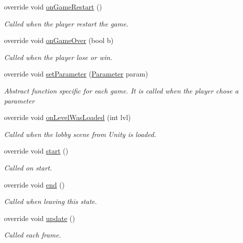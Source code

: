 \begin{DoxyCompactItemize}
\item 
override void \hyperlink{class_asteroids_state_a884ff5871f16a9444fcb460657f764ba}{on\-Game\-Restart} ()
\begin{DoxyCompactList}\small\item\em Called when the player restart the game.\end{DoxyCompactList}\item 
override void \hyperlink{class_asteroids_state_aa2ea00ce9ba4a4254ff4898ee06316e6}{on\-Game\-Over} (bool b)
\begin{DoxyCompactList}\small\item\em Called when the player lose or win.\end{DoxyCompactList}\item 
override void \hyperlink{class_asteroids_state_aaa602dee6d06851906e5db870f0e46d3}{set\-Parameter} (\hyperlink{class_parameter}{Parameter} param)
\begin{DoxyCompactList}\small\item\em Abstract function specific for each game. It is called when the player chose a parameter\end{DoxyCompactList}\item 
override void \hyperlink{class_asteroids_state_a921b0118ddb492399752bceb82ec3c89}{on\-Level\-Was\-Loaded} (int lvl)
\begin{DoxyCompactList}\small\item\em Called when the lobby scene from Unity is loaded.\end{DoxyCompactList}\item 
override void \hyperlink{class_asteroids_state_ad4866919e63dc9c1062524d78be2654a}{start} ()
\begin{DoxyCompactList}\small\item\em Called on start.\end{DoxyCompactList}\item 
override void \hyperlink{class_asteroids_state_ab24d69dd1f613038cc9ddabdc8893f4d}{end} ()
\begin{DoxyCompactList}\small\item\em Called when leaving this state.\end{DoxyCompactList}\item 
override void \hyperlink{class_asteroids_state_a7ba222181b3a3d597af0818866c69dda}{update} ()
\begin{DoxyCompactList}\small\item\em Called each frame.\end{DoxyCompactList}\item 

\end{DoxyCompactItemize}
